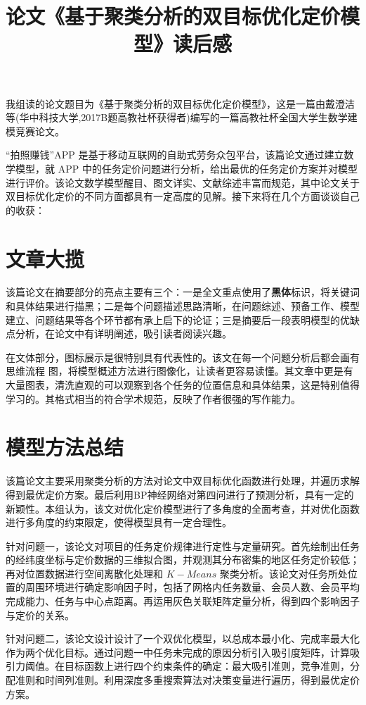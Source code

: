 \documentclass{whutmod}
\title{论文《基于聚类分析的双目标优化定价模型》读后感}
\begin{document}
	
	\maketitle
\Large   
我组读的论文题目为《基于聚类分析的双目标优化定价模型》，这是一篇由戴澄洁等(华中科技大学,2017B题高教社杯获得者)编写的一篇高教社杯全国大学生数学建模竞赛论文。

“拍照赚钱”APP 是基于移动互联网的自助式劳务众包平台，该篇论文通过建立数学模型，就 APP 中的任务定价问题进行分析，给出最优的任务定价方案并对模型进行评价。该论文数学模型醒目、图文详实、文献综述丰富而规范，其中论文关于双目标优化定价的不同方面都具有一定高度的见解。接下来将在几个方面谈谈自己的收获：

\section{文章大揽}


该篇论文在摘要部分的亮点主要有三个：一是全文重点使用了\textbf{黑体}标识，将关键词和具体结果进行描黑；二是每个问题描述思路清晰，在问题综述、预备工作、模型建立、问题结果等各个环节都有承上启下的论证；三是摘要后一段表明模型的优缺点分析，在论文中有详明阐述，吸引读者阅读兴趣。

在文体部分，图标展示是很特别具有代表性的。该文在每一个问题分析后都会画有思维流程 图，将模型概述方法进行图像化，让读者更容易读懂。其文章中更是有大量图表，清洗直观的可以观察到各个任务的位置信息和具体结果，这是特别值得学习的。其格式相当的符合学术规范，反映了作者很强的写作能力。

\section{模型方法总结}
该篇论文主要采用聚类分析的方法对论文中双目标优化函数进行处理，并遍历求解得到最优定价方案。最后利用BP神经网络对第四问进行了预测分析，具有一定的新颖性。本组认为，该文对优化定价模型进行了多角度的全面考查，并对优化函数进行多角度的约束限定，使得模型具有一定合理性。

针对问题一，该论文对项目的任务定价规律进行定性与定量研究。首先绘制出任务的经纬度坐标与定价数据的三维拟合图，并观测其分布密集的地区任务定价较低；再对位置数据进行空间离散化处理和 $K-Means$ 聚类分析。该论文对任务所处位置的周围环境进行确定影响因子时，包括了网格内任务数量、会员人数、会员平均完成能力、任务与中心点距离。再运用灰色关联矩阵定量分析，得到四个影响因子与定价的关系。

针对问题二，该论文设计设计了一个双优化模型，以总成本最小化、完成率最大化作为两个优化目标。通过问题一中任务未完成的原因分析引入吸引度矩阵，计算吸引力阈值。在目标函数上进行四个约束条件的确定：最大吸引准则，竞争准则，分配准则和时间列准则。利用深度多重搜索算法对决策变量进行遍历，得到最优定价方案。
\end{document}
